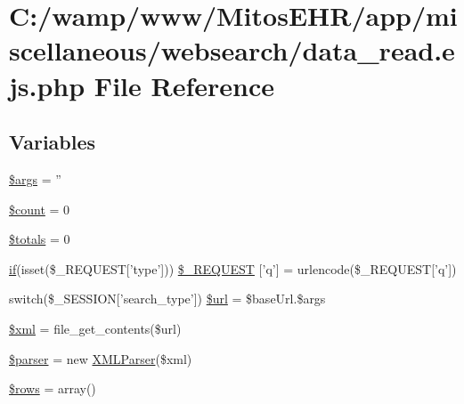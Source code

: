 \hypertarget{miscellaneous_2websearch_2data__read_8ejs_8php}{\section{\-C\-:/wamp/www/\-Mitos\-E\-H\-R/app/miscellaneous/websearch/data\-\_\-read.ejs.\-php \-File \-Reference}
\label{miscellaneous_2websearch_2data__read_8ejs_8php}
}
\subsection*{\-Variables}
\begin{DoxyCompactItemize}
\item 
\hyperlink{miscellaneous_2websearch_2data__read_8ejs_8php_a67e94494731d99ed23b123e95175bc10}{\$args} = ''
\item 
\hyperlink{miscellaneous_2websearch_2data__read_8ejs_8php_af789423037bbc89dc7c850e761177570}{\$count} = 0
\item 
\hyperlink{miscellaneous_2websearch_2data__read_8ejs_8php_ab3c7a9eeb638bd5906689f9d5cba65bc}{\$totals} = 0
\item 
\hyperlink{_setup_8inc_8php_ad0184337b31d13763ec8751feff4aabe}{if}(isset(\$\-\_\-\-R\-E\-Q\-U\-E\-S\-T\mbox{[}'type'\mbox{]})) \hyperlink{miscellaneous_2websearch_2data__read_8ejs_8php_ae2a60ecbc6012e4a7ae881b951672bb5}{\$\-\_\-\-R\-E\-Q\-U\-E\-S\-T} \mbox{[}'q'\mbox{]} = urlencode(\$\-\_\-\-R\-E\-Q\-U\-E\-S\-T\mbox{[}'q'\mbox{]})
\item 
switch(\$\-\_\-\-S\-E\-S\-S\-I\-O\-N\mbox{[}'search\-\_\-type'\mbox{]}) \hyperlink{miscellaneous_2websearch_2data__read_8ejs_8php_a8d5b9b337ab7c5f5a8c5f8d774e0c6b5}{\$url} = \$base\-Url.\$args
\item 
\hyperlink{miscellaneous_2websearch_2data__read_8ejs_8php_aa108d9d91e700ac530401dd363b0723b}{\$xml} = file\-\_\-get\-\_\-contents(\$url)
\item 
\hyperlink{miscellaneous_2websearch_2data__read_8ejs_8php_a147a766daa03d52576c7345fea31c945}{\$parser} = new \hyperlink{class_x_m_l_parser}{\-X\-M\-L\-Parser}(\$xml)
\item 
\hyperlink{miscellaneous_2websearch_2data__read_8ejs_8php_ace2ec39e7df3899fa8df9640ec274b03}{\$rows} = array()
\end{DoxyCompactItemize}


